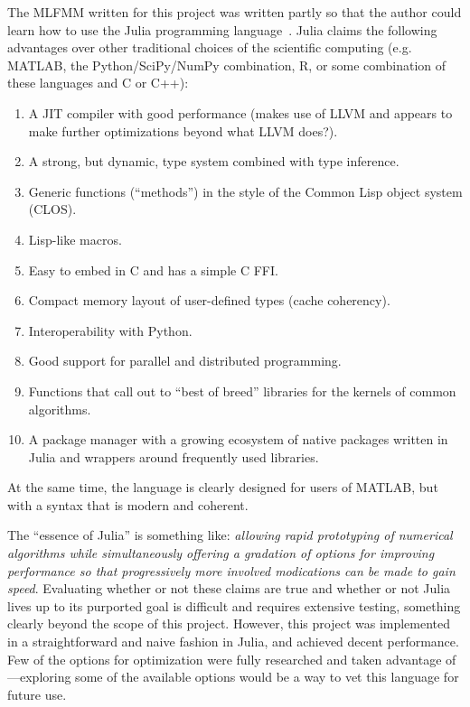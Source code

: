 The MLFMM written for this project was written partly so that the
author could learn how to use the Julia programming
language~\cite{arxiv:julia}. Julia claims the following
advantages over other traditional choices of the scientific computing
(e.g. MATLAB, the Python/SciPy/NumPy combination, R, or some
combination of these languages and C or C++):
\begin{enumerate}
\item A JIT compiler with good performance (makes use of LLVM and
  appears to make further optimizations beyond what LLVM does?).
\item A strong, but dynamic, type system combined with type inference.
\item Generic functions (``methods'') in the style of the Common Lisp
  object system (CLOS).
\item Lisp-like macros.
\item Easy to embed in C and has a simple C FFI.
\item Compact memory layout of user-defined types (cache coherency).
\item Interoperability with Python.
\item Good support for parallel and distributed programming.
\item Functions that call out to ``best of breed'' libraries for the
  kernels of common algorithms.
\item A package manager with a growing ecosystem of native packages
  written in Julia and wrappers around frequently used libraries.
\end{enumerate}
At the same time, the language is clearly designed for users of
MATLAB, but with a syntax that is modern and coherent.

The ``essence of Julia'' is something like: \emph{allowing rapid
  prototyping of numerical algorithms while simultaneously offering a
  gradation of options for improving performance so that progressively
  more involved modications can be made to gain speed}. Evaluating
whether or not these claims are true and whether or not Julia lives up
to its purported goal is difficult and requires extensive testing,
something clearly beyond the scope of this project. However, this
project was implemented in a straightforward and naive fashion in
Julia, and achieved decent performance. Few of the options for
optimization were fully researched and taken advantage
of\----exploring some of the available options would be a way to vet
this language for future use.

